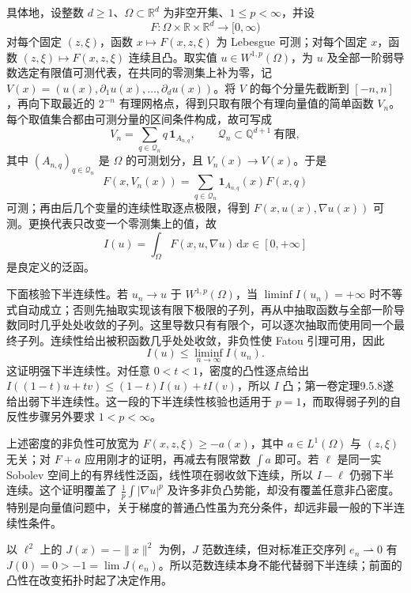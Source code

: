具体地，设整数 \(d\geq1\)、\(\Omega\subset\mathbb R^d\) 为非空开集、\(1\leq p<\infty\)，并设
\[
 F:\Omega\times\mathbb R\times\mathbb R^d\longrightarrow[0,\infty)
\]
对每个固定 \((z,\xi)\)，函数 \(x\mapsto F(x,z,\xi)\) 为 Lebesgue 可测；对每个固定 \(x\)，函数 \((z,\xi)\mapsto F(x,z,\xi)\) 连续且凸。取实值 \(u\in W^{1,p}(\Omega)\)，为 \(u\) 及全部一阶弱导数选定有限值可测代表，在共同的零测集上补为零，记
\(V(x)=(u(x),\partial_1u(x),\ldots,\partial_du(x))\)。将 \(V\) 的每个分量先截断到 \([-n,n]\)，再向下取最近的 \(2^{-n}\) 有理网格点，得到只取有限个有理向量值的简单函数 \(V_n\)。每个取值集合都由可测分量的区间条件构成，故可写成
\[
 V_n=\sum_{q\in\mathcal Q_n}q\,\mathbf1_{A_{n,q}},\qquad
 \mathcal Q_n\subset\mathbb Q^{d+1}\ \text{有限},
\]
其中 \((A_{n,q})_{q\in\mathcal Q_n}\) 是 \(\Omega\) 的可测划分，且 \(V_n(x)\to V(x)\)。于是
\[
 F(x,V_n(x))=\sum_{q\in\mathcal Q_n}
                  \mathbf1_{A_{n,q}}(x)F(x,q)
\]
可测；再由后几个变量的连续性取逐点极限，得到 \(F(x,u(x),\nabla u(x))\) 可测。更换代表只改变一个零测集上的值，故
\[
 I(u)=\int_\Omega F(x,u,\nabla u)\,\mathrm dx\in[0,+\infty]
\]
是良定义的泛函。

\ProseParagraphBreak

下面核验下半连续性。若 \(u_n\to u\) 于 \(W^{1,p}(\Omega)\)，当 \(\liminf I(u_n)=+\infty\) 时不等式自动成立；否则先抽取实现该有限下极限的子列，再从中抽取函数与全部一阶导数同时几乎处处收敛的子列。这里导数只有有限个，可以逐次抽取而使用同一个最终子列。连续性给出被积函数几乎处处收敛，非负性使 Fatou 引理可用，因此
\[
 I(u)\leq\liminf_{n\to\infty}I(u_n).
\]
这证明强下半连续性。对任意 \(0<t<1\)，密度的凸性逐点给出
\(I((1-t)u+tv)\leq(1-t)I(u)+tI(v)\)，所以 \(I\) 凸；第一卷定理9.5.8遂给出弱下半连续性。这一段的下半连续性核验也适用于 \(p=1\)，而取得弱子列的自反性步骤另外要求 \(1<p<\infty\)。

\ProseParagraphBreak

上述密度的非负性可放宽为 \(F(x,z,\xi)\geq-a(x)\)，其中 \(a\in L^1(\Omega)\) 与 \((z,\xi)\) 无关；对 \(F+a\) 应用刚才的证明，再减去有限常数 \(\int a\) 即可。若 \(\ell\) 是同一实 Sobolev 空间上的有界线性泛函，线性项在弱收敛下连续，所以 \(I-\ell\) 仍弱下半连续。这个证明覆盖了 \(\tfrac1p\int|\nabla u|^p\) 及许多非负凸势能，却没有覆盖任意非凸密度。特别是向量值问题中，关于梯度的普通凸性虽为充分条件，却远非最一般的下半连续性条件。

\ProseParagraphBreak

以 \(\ell^2\) 上的 \(J(x)=-\lVert x\rVert^2\) 为例，\(J\) 范数连续，但对标准正交序列 \(e_n\rightharpoonup0\) 有 \(J(0)=0>-1=\lim J(e_n)\)。所以范数连续本身不能代替弱下半连续；前面的凸性在改变拓扑时起了决定作用。

